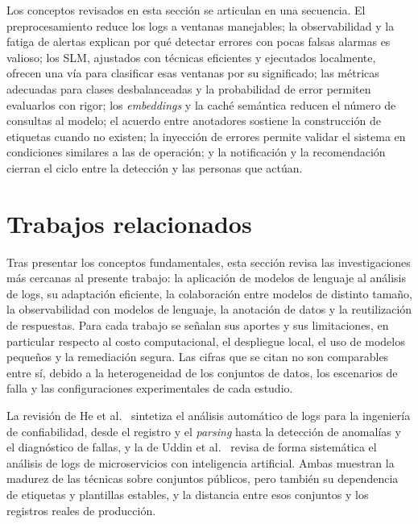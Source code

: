 Los conceptos revisados en esta sección se articulan en una secuencia. El preprocesamiento reduce los logs a ventanas manejables; la observabilidad y la fatiga de alertas explican por qué detectar errores con pocas falsas alarmas es valioso; los SLM, ajustados con técnicas eficientes y ejecutados localmente, ofrecen una vía para clasificar esas ventanas por su significado; las métricas adecuadas para clases desbalanceadas y la probabilidad de error permiten evaluarlos con rigor; los \textit{embeddings} y la caché semántica reducen el número de consultas al modelo; el acuerdo entre anotadores sostiene la construcción de etiquetas cuando no existen; la inyección de errores permite validar el sistema en condiciones similares a las de operación; y la notificación y la recomendación cierran el ciclo entre la detección y las personas que actúan.

\section{Trabajos relacionados}\label{cap:trabajos_relacionados}

Tras presentar los conceptos fundamentales, esta sección revisa las investigaciones más cercanas al presente trabajo: la aplicación de modelos de lenguaje al análisis de logs, su adaptación eficiente, la colaboración entre modelos de distinto tamaño, la observabilidad con modelos de lenguaje, la anotación de datos y la reutilización de respuestas. Para cada trabajo se señalan sus aportes y sus limitaciones, en particular respecto al costo computacional, el despliegue local, el uso de modelos pequeños y la remediación segura. Las cifras que se citan no son comparables entre sí, debido a la heterogeneidad de los conjuntos de datos, los escenarios de falla y las configuraciones experimentales de cada estudio.

La revisión de He et al.~\cite{he2021_survey} sintetiza el análisis automático de logs para la ingeniería de confiabilidad, desde el registro y el \textit{parsing} hasta la detección de anomalías y el diagnóstico de fallas, y la de Uddin et al.~\cite{uddin2026_microservice_logs} revisa de forma sistemática el análisis de logs de microservicios con inteligencia artificial. Ambas muestran la madurez de las técnicas sobre conjuntos públicos, pero también su dependencia de etiquetas y plantillas estables, y la distancia entre esos conjuntos y los registros reales de producción.

